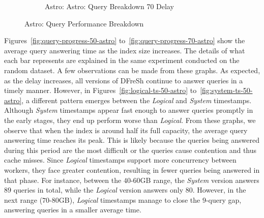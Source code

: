 \begin{figure}
\begin{subfigure}[c]{0.45\textwidth}
		\caption{Astro: Astro: Query Breakdown 70 Delay}
		\label{fig:actual-query-breakdown-70-astro}
	\end{subfigure}
	\caption{Astro: Query Performance Breakdown}
	\label{fig:dfresh-query-breakdown-astro}
\end{figure}

%
Figures~\ref{fig:query-progress-50-astro} to~\ref{fig:query-progress-70-astro} show 
the average query answering time as the index size increases. The details of what each
bar represents are explained in the same experiment conducted on the random dataset.
A few observations can be made from these graphs. As expected, as the delay increases,
all versions of DFreSh continue to answer queries in a timely manner. However, in
Figures~\ref{fig:logical-ts-50-astro} to~\ref{fig:system-ts-50-astro}, a different
pattern emerges between the \textit{Logical} and \textit{System} timestamps. Although
\textit{System} timestamps appear fast enough to answer queries promptly in the early
stages, they end up perform worse than \textit{Logical}.
%
From these graphs, we observe that when the index is around half its full capacity,
the average query answering time reaches its peak. This is likely because the queries
being answered during this period are the most difficult or the queries cause contention
and thus cache misses. Since \textit{Logical} timestamps support more concurrency
between workers, they face greater contention, resulting in fewer queries being
answered in that phase. For instance, between the $40$-$60$GB range, the
\textit{System} version answers $89$ queries in total, while the \textit{Logical}
version answers only $80$. However, in the next range ($70$-$80$GB), \textit{Logical}
timestamps manage to close the $9$-query gap, answering queries in a smaller
average time.


